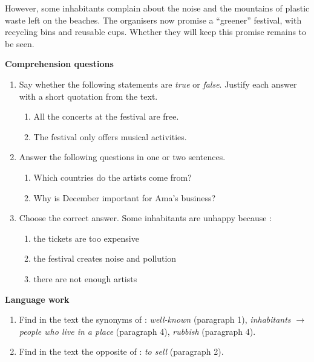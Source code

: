 \documentclass[11pt]{article}
\begin{document}
\begin{exercice}
\begin{textebox}
However, some inhabitants complain about the noise and the mountains of plastic waste left on the beaches. The organisers now promise a “greener” festival, with recycling bins and reusable cups. Whether they will keep this promise remains to be seen.
\end{textebox}
\textbf{Comprehension questions}
\begin{enumerate}
\item Say whether the following statements are \emph{true} or \emph{false}. Justify each answer with a short quotation from the text.
\begin{enumerate}
\item All the concerts at the festival are free.
\item The festival only offers musical activities.
\end{enumerate}
\item Answer the following questions in one or two sentences.
\begin{enumerate}
\item Which countries do the artists come from?
\item Why is December important for Ama's business?
\end{enumerate}
\item Choose the correct answer. Some inhabitants are unhappy because :
\begin{enumerate}
\item the tickets are too expensive
\item the festival creates noise and pollution
\item there are not enough artists
\end{enumerate}
\end{enumerate}
\textbf{Language work}
\begin{enumerate}
\item Find in the text the synonyms of : \emph{well-known} (paragraph 1), \emph{inhabitants} $\to$ \emph{people who live in a place} (paragraph 4), \emph{rubbish} (paragraph 4).
\item Find in the text the opposite of : \emph{to sell} (paragraph 2).
\end{enumerate}
\end{exercice}
\end{document}
